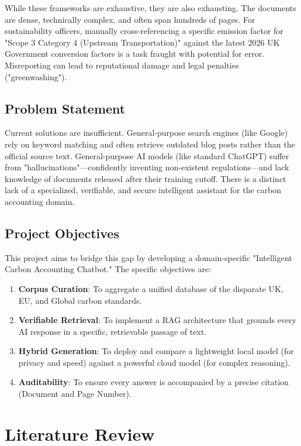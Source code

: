 \documentclass[12pt, a4paper]{article}
\begin{document}
While these frameworks are exhaustive, they are also exhausting. The documents are dense, technically complex, and often span hundreds of pages. For sustainability officers, manually cross-referencing a specific emission factor for "Scope 3 Category 4 (Upstream Transportation)" against the latest 2026 UK Government conversion factors is a task fraught with potential for error. Misreporting can lead to reputational damage and legal penalties ("greenwashing").

\subsection{Problem Statement}
Current solutions are insufficient. General-purpose search engines (like Google) rely on keyword matching and often retrieve outdated blog posts rather than the official source text. General-purpose AI models (like standard ChatGPT) suffer from "hallucinations"—confidently inventing non-existent regulations—and lack knowledge of documents released after their training cutoff. There is a distinct lack of a specialized, verifiable, and secure intelligent assistant for the carbon accounting domain.

\subsection{Project Objectives}
This project aims to bridge this gap by developing a domain-specific "Intelligent Carbon Accounting Chatbot." The specific objectives are:
\begin{enumerate}
    \item \textbf{Corpus Curation}: To aggregate a unified database of the disparate UK, EU, and Global carbon standards.
    \item \textbf{Verifiable Retrieval}: To implement a RAG architecture that grounds every AI response in a specific, retrievable passage of text.
    \item \textbf{Hybrid Generation}: To deploy and compare a lightweight local model (for privacy and speed) against a powerful cloud model (for complex reasoning).
    \item \textbf{Auditability}: To ensure every answer is accompanied by a precise citation (Document and Page Number).
\end{enumerate}

\section{Literature Review}
\end{document}
